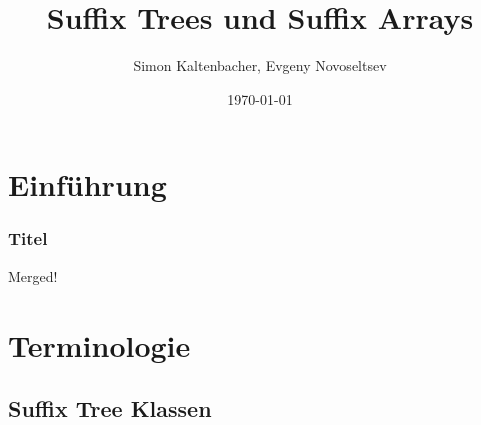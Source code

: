 \documentclass{beamer}
\title{Suffix Trees und Suffix Arrays}
\author{Simon Kaltenbacher, Evgeny Novoseltsev}
\date{\today}
\begin{document}

\frame{\titlepage}




\section{Einführung}
\begin{frame}
\frametitle{Titel}
Merged!
\end{frame}


\section{Terminologie}


\subsection{Suffix Tree Klassen}
\end{document}
